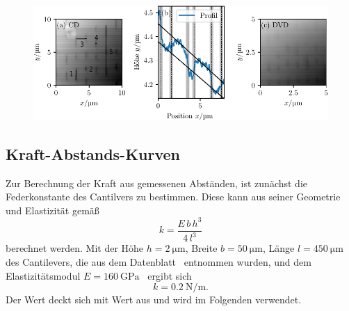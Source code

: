 \begin{figure}
  \centering
  \includegraphics[scale = 1]{../analysis/data/cd/cd_profil.pdf}
  \caption{}
  \label{fig: cd}
\end{figure}

\subsection{Kraft-Abstands-Kurven}
Zur Berechnung der Kraft aus gemessenen Abständen, ist zunächst die Federkonstante des Cantilvers zu bestimmen. Diese kann
aus seiner Geometrie und Elastizität gemäß
\begin{equation}
  k = \frac{E \, b \, h^3}{4 \, l^3}
\end{equation}
berechnet werden. Mit der Höhe $h = \SI{2}{\micro\meter}$, Breite $b = \SI{50}{\micro\meter}$, Länge $l = \SI{450}{\micro\meter}$
des Cantilevers, die aus dem Datenblatt~\cite{cantilever} entnommen wurden, und dem Elastizitätsmodul $E = \SI{160}{\giga\pascal}$~\cite{emodulsi}
ergibt sich
\begin{equation}
  k = \SI{0.2}{\newton \per \meter}.
\end{equation}
Der Wert deckt sich mit Wert aus \cite{cantilever} und wird im Folgenden verwendet.

